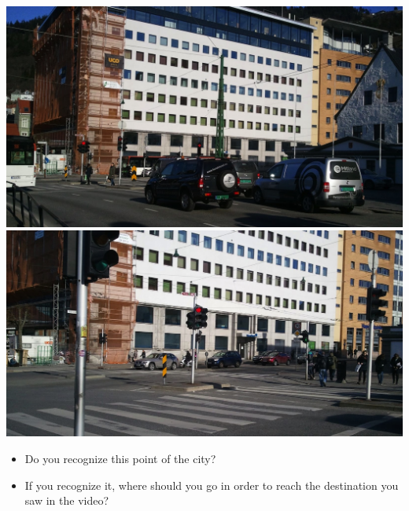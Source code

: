 \documentclass[12pt,a4paper,openright, notitlepage]{report}
\begin{document}
\includegraphics[width=\textwidth]{imgs/image-question33-1}
\includegraphics[width=\textwidth]{imgs/image-question33-2}

\begin{itemize}
	\item Do you recognize this point of the city?
	\item If you recognize it, where should you go in order to reach the destination you saw in the video?
\end{itemize}

\newpage


\end{document}
